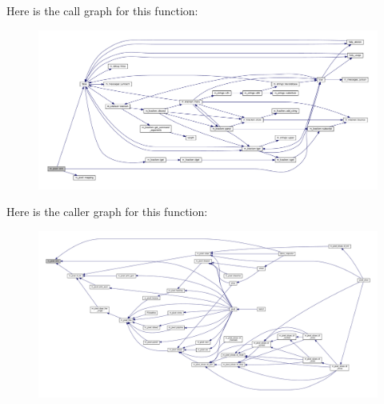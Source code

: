 Here is the call graph for this function\+:
\nopagebreak
\begin{figure}[H]
\begin{center}
\leavevmode
\includegraphics[width=350pt]{namespacem__pixel_ac03ca8f23fdadb60599b6ea4dc87a6d9_cgraph}
\end{center}
\end{figure}
Here is the caller graph for this function\+:
\nopagebreak
\begin{figure}[H]
\begin{center}
\leavevmode
\includegraphics[width=350pt]{namespacem__pixel_ac03ca8f23fdadb60599b6ea4dc87a6d9_icgraph}
\end{center}
\end{figure}
\mbox{\label{namespacem__pixel_a9d4aea8ae2eb15317b83fa03a11371b2}} 
